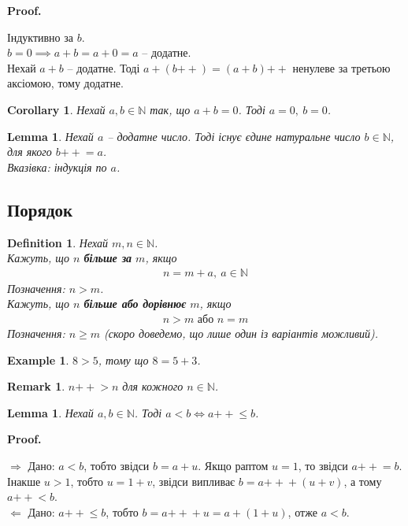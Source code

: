 \documentclass[a4paper, 14pt]{extarticle}
\makeatletter
\def\rightproof{$\boxed{\Rightarrow}$ }
\def\leftproof{$\boxed{\Leftarrow}$ }
\theoremstyle{theoremdd}
\theoremstyle{theoremdd}
\newtheorem{definition}[theorem]{Definition}
\theoremstyle{theoremdd}
\theoremstyle{theoremdd}
\theoremstyle{theoremdd}
\theoremstyle{theoremdd}
\newtheorem{example}[theorem]{Example}
\theoremstyle{theoremdd}
\theoremstyle{theoremdd}
\theoremstyle{theoremdd}
\theoremstyle{theoremdd}
\theoremstyle{theoremdd}
\theoremstyle{theoremdd}
\newtheorem{remark}[theorem]{Remark}
\theoremstyle{theoremdd}
\theoremstyle{theoremdd}
\newtheorem{lemma}[theorem]{Lemma}
\theoremstyle{theoremdd}
\newtheorem{corollary}[theorem]{Corollary}
\theoremstyle{theoremdd}
\renewenvironment{proof}[1][Proof.\\]{\par
\pushQED{\hfill \qed}%
\normalfont \topsep6\p@\@plus6\p@\relax
\trivlist
\item\relax
{\bfseries
#1\@addpunct{.}}\hspace\labelsep\ignorespaces
}{%
\popQED\endtrivlist\@endpefalse
}
\newcommand{\plusplus}{\!\!\mathrel{++}}
\makeatother
\begin{document}
\begin{proof}
Індуктивно за $b$.\\
$b = 0 \implies a+b = a+0 = a$ -- додатне.\\
Нехай $a + b$ -- додатне. Тоді $a + (b \plusplus) = (a+b)\plusplus$ ненулеве за третьою аксіомою, тому додатне.
\end{proof}

\begin{corollary}
Нехай $a,b \in \mathbb{N}$ так, що $a+b = 0$. Тоді $a = 0,\ b = 0$.
\end{corollary}

\begin{lemma}
Нехай $a$ -- додатне число. Тоді існує єдине натуральне число $b \in \mathbb{N}$, для якого $b \plusplus = a$. \\
\textit{Вказівка: індукція по $a$.}
\end{lemma}
\fi

\subsection{Порядок}
\begin{definition}
Нехай $m,n \in \mathbb{N}$.\\
Кажуть, що $n$ \textbf{більше за} $m$, якщо \begin{align*}
n = m + a,\ a \in \mathbb{N}
\end{align*}
Позначення: $n > m$.\\
Кажуть, що $n$ \textbf{більше або дорівнює} $m$, якщо
\begin{align*}
n > m \text{ або } n = m
\end{align*}
Позначення: $n \geq m$ (скоро доведемо, що лише один із варіантів можливий).
\end{definition}

\begin{example}
$8 > 5$, тому що $8 = 5 + 3$.
\end{example}

\begin{remark}
$n \plusplus > n$ для кожного $n \in \mathbb{N}$.
\end{remark}

\begin{lemma}
Нехай $a,b \in \mathbb{N}$. Тоді $a < b \iff a \plusplus \leq b$.
\end{lemma}

\begin{proof}
\rightproof Дано: $a < b$, тобто звідси $b = a + u$. Якщо раптом $u = 1$, то звідси $a\plusplus = b$. Інакше $u > 1$, тобто $u = 1 + v$, звідси випливає $b = a \plusplus + (u+v)$, а тому $a \plusplus < b$.
\bigskip \\
\leftproof Дано: $a \plusplus \leq b$, тобто $b = a\plusplus + u = a + (1+u)$, отже $a <b$.
\end{proof}
\end{document}
